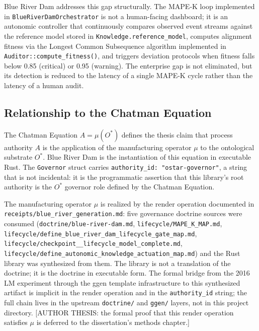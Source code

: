 Blue River Dam addresses this gap structurally. The MAPE-K loop implemented
in \texttt{BlueRiverDamOrchestrator} is not a human-facing dashboard; it is an
autonomic controller that continuously compares observed event streams against
the reference model stored in \texttt{Knowledge.reference\_model}, computes
alignment fitness via the Longest Common Subsequence algorithm implemented in
\texttt{Auditor::compute\_fitness()}, and triggers deviation protocols when
fitness falls below 0.85 (critical) or 0.95 (warning). The enterprise gap is
not eliminated, but its detection is reduced to the latency of a single MAPE-K
cycle rather than the latency of a human audit.

\subsection{Relationship to the Chatman Equation}
\label{sec:blue-river-dam-lineage-chatman}

The Chatman Equation $A = \mu(O^*)$ defines the thesis claim that process
authority $A$ is the application of the manufacturing operator $\mu$ to the
ontological substrate $O^*$. Blue River Dam is the instantiation of this
equation in executable Rust. The \texttt{Governor} struct carries
\texttt{authority\_id: "ostar-governor"}, a string that is not incidental: it
is the programmatic assertion that this library's root authority is the
$O^*$ governor role defined by the Chatman Equation.

The manufacturing operator $\mu$ is realized by the render operation documented
in \texttt{receipts/blue\_river\_generation.md}: five governance doctrine sources
were consumed (\texttt{doctrine/blue-river-dam.md},
\texttt{lifecycle/MAPE\_K\_MAP.md},
\texttt{lifecycle/define\_blue\_river\_dam\_lifecycle\_gate\_map.md},
\texttt{lifecycle/checkpoint\_\_lifecycle\_model\_complete.md},
\texttt{lifecycle/define\_autonomic\_knowledge\_actuation\_map.md}) and
the Rust library was synthesized from them. The library is not a translation of
the doctrine; it is the doctrine in executable form. The formal bridge from
the 2016 LM experiment through the ggen template infrastructure to this
synthesized artifact is implicit in the render operation and in the
\texttt{authority\_id} string; the full chain lives in the upstream
\texttt{doctrine/} and \texttt{ggen/} layers, not in this project directory.
[AUTHOR THESIS: the formal proof that this render operation satisfies $\mu$
is deferred to the dissertation's methods chapter.]

